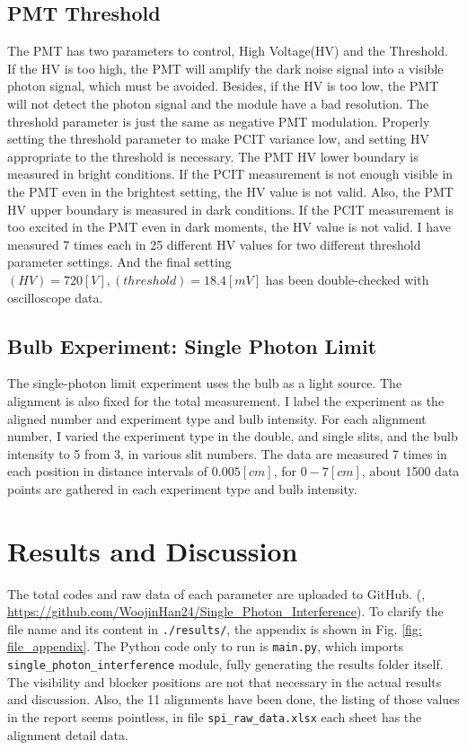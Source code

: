 \documentclass{article}
\begin{document}
\subsection{PMT Threshold}
The PMT has two parameters to control, High Voltage(HV) and the Threshold.
If the HV is too high, the PMT will amplify the dark noise signal into a visible photon signal, which must be avoided.
Besides, if the HV is too low, the PMT will not detect the photon signal and the module have a bad resolution.
The threshold parameter is just the same as negative PMT modulation.
Properly setting the threshold parameter to make PCIT variance low, and setting HV appropriate to the threshold is necessary.
The PMT HV lower boundary is measured in bright conditions.
If the PCIT measurement is not enough visible in the PMT even in the brightest setting, the HV value is not valid.
Also, the PMT HV upper boundary is measured in dark conditions.
If the PCIT measurement is too excited in the PMT even in dark moments, the HV value is not valid.
I have measured 7 times each in 25 different HV values for two different threshold parameter settings.
And the final setting $(HV) = 720 [V], (threshold) = 18.4 [mV]$ has been double-checked with oscilloscope data.

\subsection{Bulb Experiment: Single Photon Limit}
The single-photon limit experiment uses the bulb as a light source.
The alignment is also fixed for the total measurement.
I label the experiment as the aligned number and experiment type and bulb intensity.
For each alignment number, I varied the experiment type in the double, and single slits, and the bulb intensity to 5 from 3, in various slit numbers.
The data are measured 7 times in each position in distance intervals of $0.005 [cm]$, for $0 - 7 [cm]$, about 1500 data points are gathered in each experiment type and bulb intensity.


\section{Results and Discussion}
The total codes and raw data of each parameter are uploaded to GitHub.
(\cite{github}, \url{https://github.com/WoojinHan24/Single_Photon_Interference}).
To clarify the file name and its content in \verb|./results/|, the appendix is shown in Fig. \ref{fig: file_appendix}.
The Python code only to run is \verb|main.py|, which imports \verb|single_photon_interference| module, fully generating the results folder itself.
The visibility and blocker positions are not that necessary in the actual results and discussion.
Also, the 11 alignments have been done, the listing of those values in the report seems pointless, in file \verb|spi_raw_data.xlsx| each sheet has the alignment detail data.
\end{document}
